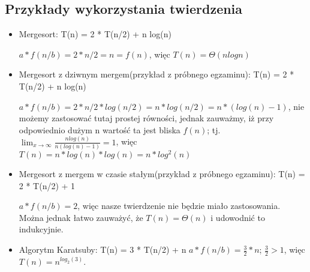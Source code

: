 \subsection{Przykłady wykorzystania twierdzenia}
\begin{itemize}
\item Mergesort: T(n) = 2 * T(n/2) + n log(n)
\par $a * f(n/b) = 2 * n/2 = n = f(n)$, więc $T(n) = \Theta(n log n)$
\item Mergesort z dziwnym mergem(przykład z próbnego egzaminu): T(n) = 2 * T(n/2) + n log(n)
\par $a * f(n/b) = 2 * n/2 * log(n/2) = n * log(n/2) = n * (log(n) - 1)$, nie możemy zastosować tutaj prostej równości, jednak zauważmy, iż przy odpowiednio dużym n wartość ta jest bliska $f(n)$; tj. $\lim_{x\to\infty} \frac{n log(n)}{n (log(n) - 1)} = 1$, więc $T(n) = n * log(n) * log(n) = n * log^{2}(n)$
\item Mergesort z mergem w czasie stałym(przykład z próbnego egzaminu): T(n) = 2 * T(n/2) + 1
\par  $a * f(n/b) = 2$, więc nasze twierdzenie nie będzie miało zastosowania. Można jednak łatwo zauważyć, że $T(n) = \Theta (n)$ i udowodnić to indukcyjnie.
\item Algorytm Karatsuby: T(n) = 3 * T(n/2) + n
$a * f(n/b) = \frac{3}{2} * n$; $\frac{3}{2} > 1$, więc $T(n)=n^{log_2(3)}$.
\end{itemize}